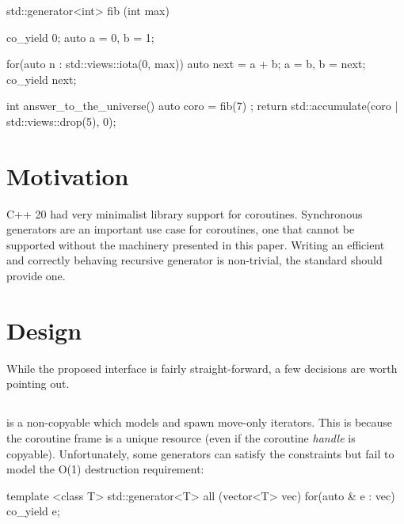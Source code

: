 \documentclass{wg21}
\begin{document}
\begin{colorblock}
    std::generator<int> fib (int max) {
        co_yield 0;
        auto a = 0, b = 1;
        
        for(auto n : std::views::iota(0, max))  {
            auto next = a + b;
            a = b, b = next;
            co_yield next;
        }
    }
    
    int answer_to_the_universe() {
        auto coro = fib(7) ;
        return std::accumulate(coro | std::views::drop(5), 0);
    }
    
\end{colorblock}

\section{Motivation}

C++ 20 had very minimalist library support for coroutines.
Synchronous generators are an important use case for coroutines, one that cannot be supported without 
the machinery presented in this paper.
Writing an efficient and correctly behaving recursive generator is non-trivial, the standard should provide one.


\section{Design}

While the proposed  interface is fairly straight-forward, a few decisions are worth pointing out.

\subsection{}

 is a non-copyable  which models  and spawn move-only iterators.
This is because the coroutine frame is a unique resource (even if the coroutine \textit{handle} is copyable).
Unfortunately, some generators can satisfy the  constraints but fail to model the  O(1) 
destruction requirement:

\begin{colorblock}
    
    template <class T>
    std::generator<T> all (vector<T> vec) {
        for(auto & e : vec)  {
            co_yield e;
        }
    }
    
\end{colorblock}
\end{document}
